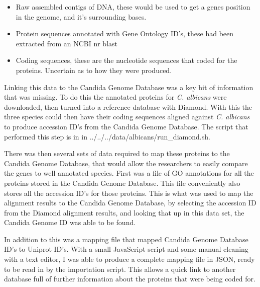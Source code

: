 \begin{itemize}
  \item Raw assembled contigs of DNA, these would be used to get a genes position in the genome, and it's surrounding bases. 
  \item Protein sequences annotated with Gene Ontology ID's, these had been extracted from an NCBI nr blast
  \item Coding sequences, these are the nucleotide sequences that coded for the proteins. Uncertain as to how they were produced.
\end{itemize}

Linking this data to the Candida Genome Database was a key bit of information that was missing. To do this the annotated proteins for \textit{C. albicans}\cite{albicans} were downloaded, then turned into a reference database with Diamond. With this the three species could then have their coding sequences aligned against \textit{C. albicans} to produce accession ID's from the Candida Genome Database. The script that performed this step is in in ../../../data/albicans/run_diamond.sh.

There was then several sets of data required to map these proteins to the Candida Genome Database, that would allow the researchers to easily compare the genes to well annotated species. First was a file of GO annotations for all the proteins stored in the Candida Genome Database. \cite{cgd-proteins} This file conveniently also stores all the accession ID's for those proteins. This is what was used to map the alignment results to the Candida Genome Database, by selecting the accession ID from the Diamond alignment results, and looking that up in this data set, the Candida Genome ID was able to be found.

In addition to this was a mapping file that mapped Candida Genome Database ID's to Uniprot ID's. With a small JavaScript script and some manual cleaning with a text editor, I was able to produce a complete mapping file in JSON, ready to be read in by the importation script. This allows a quick link to another database full of further information about the proteins that were being coded for. 
